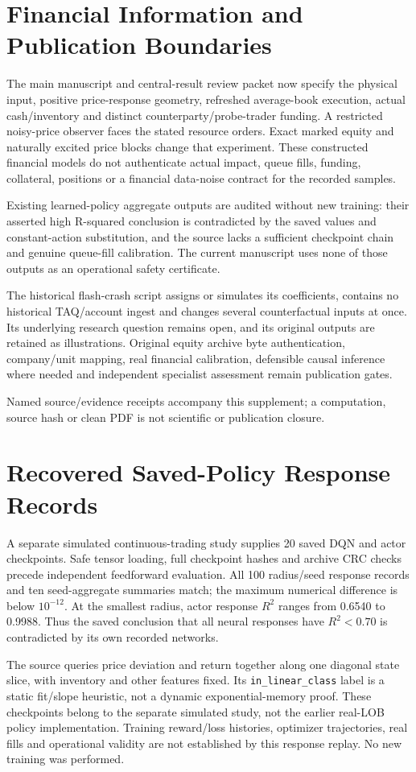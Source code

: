 \documentclass[10pt]{article}
\begin{document}
\section{Financial Information and Publication Boundaries}
The main manuscript and central-result review packet now specify the physical input, positive price-response geometry, refreshed average-book execution, actual cash/inventory and distinct counterparty/probe-trader funding. A restricted noisy-price observer faces the stated resource orders. Exact marked equity and naturally excited price blocks change that experiment. These constructed financial models do not authenticate actual impact, queue fills, funding, collateral, positions or a financial data-noise contract for the recorded samples.

Existing learned-policy aggregate outputs are audited without new training: their asserted high R-squared conclusion is contradicted by the saved values and constant-action substitution, and the source lacks a sufficient checkpoint chain and genuine queue-fill calibration. The current manuscript uses none of those outputs as an operational safety certificate.

The historical flash-crash script assigns or simulates its coefficients, contains no historical TAQ/account ingest and changes several counterfactual inputs at once. Its underlying research question remains open, and its original outputs are retained as illustrations. Original equity archive byte authentication, company/unit mapping, real financial calibration, defensible causal inference where needed and independent specialist assessment remain publication gates.

Named source/evidence receipts accompany this supplement; a computation, source hash or clean PDF is not scientific or publication closure.
\section{Recovered Saved-Policy Response Records}
A separate simulated continuous-trading study supplies 20 saved DQN and actor checkpoints. Safe tensor loading, full checkpoint hashes and archive CRC checks precede independent feedforward evaluation. All 100 radius/seed response records and ten seed-aggregate summaries match; the maximum numerical difference is below $10^{-12}$. At the smallest radius, actor response $R^2$ ranges from 0.6540 to 0.9988. Thus the saved conclusion that all neural responses have $R^2<0.70$ is contradicted by its own recorded networks.

The source queries price deviation and return together along one diagonal state slice, with inventory and other features fixed. Its \texttt{in\_linear\_class} label is a static fit/slope heuristic, not a dynamic exponential-memory proof. These checkpoints belong to the separate simulated study, not the earlier real-LOB policy implementation. Training reward/loss histories, optimizer trajectories, real fills and operational validity are not established by this response replay. No new training was performed.
\end{document}
